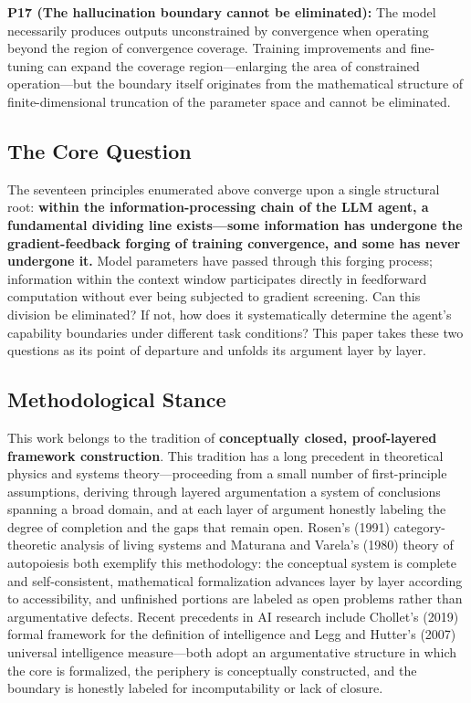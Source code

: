 \documentclass[11pt,a4paper]{article}
\theoremstyle{definition}
\begin{document}
\textbf{P17 (The hallucination boundary cannot be eliminated):} The model necessarily produces outputs unconstrained by convergence when operating beyond the region of convergence coverage. Training improvements and fine-tuning can expand the coverage region---enlarging the area of constrained operation---but the boundary itself originates from the mathematical structure of finite-dimensional truncation of the parameter space and cannot be eliminated.

\subsection{The Core Question}

The seventeen principles enumerated above converge upon a single structural root: \textbf{within the information-processing chain of the LLM agent, a fundamental dividing line exists---some information has undergone the gradient-feedback forging of training convergence, and some has never undergone it.} Model parameters have passed through this forging process; information within the context window participates directly in feedforward computation without ever being subjected to gradient screening. Can this division be eliminated? If not, how does it systematically determine the agent's capability boundaries under different task conditions? This paper takes these two questions as its point of departure and unfolds its argument layer by layer.

\subsection{Methodological Stance}

This work belongs to the tradition of \textbf{conceptually closed, proof-layered framework construction}. This tradition has a long precedent in theoretical physics and systems theory---proceeding from a small number of first-principle assumptions, deriving through layered argumentation a system of conclusions spanning a broad domain, and at each layer of argument honestly labeling the degree of completion and the gaps that remain open. Rosen's (1991) category-theoretic analysis of living systems and Maturana and Varela's (1980) theory of autopoiesis both exemplify this methodology: the conceptual system is complete and self-consistent, mathematical formalization advances layer by layer according to accessibility, and unfinished portions are labeled as open problems rather than argumentative defects. Recent precedents in AI research include Chollet's (2019) formal framework for the definition of intelligence and Legg and Hutter's (2007) universal intelligence measure---both adopt an argumentative structure in which the core is formalized, the periphery is conceptually constructed, and the boundary is honestly labeled for incomputability or lack of closure.
\end{document}
